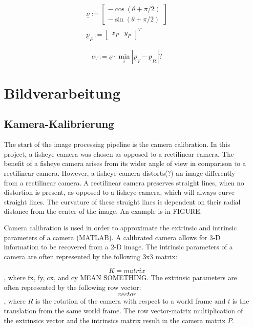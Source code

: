 \documentclass[arbeit=studie,oneside,BCOR=12mm]{ArbeitRST}
\begin{document}
    \begin{gather}
        \underline{\nu} := 
        \begin{bmatrix}
            -\cos(\theta + \pi/2) \\
            -\sin(\theta + \pi/2)
        \end{bmatrix} \\
        \underline{p}_P := 
        \begin{bmatrix}
            x_P & y_P
        \end{bmatrix}^T
    \end{gather}

    \begin{equation}
        e_V :=  \underline{\nu} \cdot \min_i |\underline{p}_V -  \underline{p}_{Pi}| ?
        \label{eq:Querabweichung}
    \end{equation}

\chapter{Bildverarbeitung}
\section{Kamera-Kalibrierung}
The start of the image processing pipeline is the camera calibration. In this 
project, a fisheye camera was chosen as opposed to a rectilinear camera. The 
benefit of a 
fisheye camera arises from its wider angle of view in comparison to a 
rectilinear camera. However, a fisheye camera distorts(?) an image differently 
from a rectilinear 
camera. A rectilinear camera preserves straight lines, when no distortion is 
present, as opposed to a fisheye camera, which will always curve straight lines. 
The 
curvature of these straight lines is dependent on their radial distance from 
the center of the image.  An example is in FIGURE.

Camera calibration is used in order to approximate the extrinsic and intrinsic 
parameters of a camera (MATLAB). A calibrated camera allows for 3-D information
to be recovered from a 2-D image. The intrinsic parameters of a camera are often 
represented by the following 3x3 matrix:

$$K = matrix$$, where fx, fy, cx, and cy MEAN SOMETHING. The extrinsic
parameters are often represented by the following row vector:
$$vector$$, where $R$ is the rotation of the camera with respect to a world 
frame and $t$ is the translation from the same world frame. The row 
vector-matrix multiplication of the extrinsics vector and the intrinsics matrix
result in the camera matrix $P$.
\end{document}
